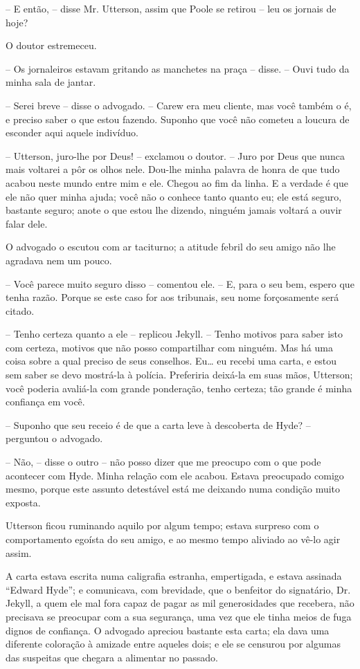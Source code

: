 -- E então, -- disse Mr. Utterson, assim que Poole se retirou -- leu os
jornais de hoje?

O doutor estremeceu.

-- Os jornaleiros estavam gritando as manchetes na praça -- disse. --
Ouvi tudo da minha sala de jantar.

-- Serei breve -- disse o advogado. -- Carew era meu cliente, mas você
também o é, e preciso saber o que estou fazendo. Suponho que você não
cometeu a loucura de esconder aqui aquele indivíduo.

-- Utterson, juro-lhe por Deus! -- exclamou o doutor. -- Juro por Deus
que nunca mais voltarei a pôr os olhos nele.  Dou-lhe minha palavra de
honra de que tudo acabou neste mundo entre mim e ele.  Chegou ao fim da
linha.  E a verdade é que ele não quer minha ajuda; você não o conhece
tanto quanto eu; ele está seguro, bastante seguro; anote o que estou
lhe dizendo, ninguém jamais voltará a ouvir falar dele. 

O advogado o escutou com ar taciturno; a atitude febril do seu amigo não
lhe agradava nem um pouco.

-- Você parece muito seguro disso -- comentou ele. -- E, para o seu bem,
espero que tenha razão.  Porque se este caso for aos tribunais, seu
nome forçosamente será citado.

-- Tenho certeza quanto a ele -- replicou Jekyll. -- Tenho motivos para
saber isto com certeza, motivos que não posso compartilhar com ninguém.
 Mas há uma coisa sobre a qual preciso de seus conselhos. Eu\ldots{} eu
recebi uma carta, e estou sem saber se devo mostrá-la à polícia. 
Preferiria deixá-la em suas mãos, Utterson; você poderia avaliá-la com
grande ponderação, tenho certeza; tão grande é minha confiança em você.

-- Suponho que seu receio é de que a carta leve à descoberta de Hyde? --
perguntou o advogado.

-- Não, -- disse o outro -- não posso dizer que me preocupo com o que
pode acontecer com Hyde.  Minha relação com ele acabou.  Estava
preocupado comigo mesmo, porque este assunto detestável está me
deixando numa condição muito exposta.

Utterson ficou ruminando aquilo por algum tempo; estava surpreso com o
comportamento egoísta do seu amigo, e ao mesmo tempo aliviado ao vê-lo
agir assim.

A carta estava escrita numa caligrafia estranha, empertigada, e estava
assinada “Edward Hyde”; e comunicava, com brevidade, que o benfeitor do
signatário, Dr. Jekyll, a quem ele mal fora capaz de pagar as mil
generosidades que recebera, não precisava se preocupar com a sua
segurança, uma vez que ele tinha meios de fuga dignos de confiança.  O
advogado apreciou bastante esta carta; ela dava uma diferente coloração
à amizade entre aqueles dois; e ele se censurou por algumas das
suspeitas que chegara a alimentar no passado.

